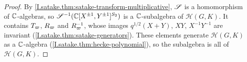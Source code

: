 \begin{theorem}
\end{theorem}
\begin{proof}
By \cref{I.satake.thm:satake-transform-multiplicative}, $\mathscr{S}$ is a homomorphism of $\mathbb{C}$-algebras, so
$\mathscr{S}^{-1}(\mathbb{C}[X^{\pm1},Y^{\pm1}]^{S_2})$ is a $\mathbb{C}$-subalgebra of $\mathcal H(G,K)$. It contains $T_\varpi$, $R_\varpi$
and $R_\varpi^{-1}$, whose images $q^{1/2}(X+Y)$, $XY$, $X^{-1}Y^{-1}$ are invariant
(\cref{I.satake.thm:satake-generators}). These elements generate $\mathcal H(G,K)$ as a $\mathbb{C}$-algebra
(\cref{I.satake.thm:hecke-polynomial}), so the subalgebra is all of $\mathcal H(G,K)$.
\end{proof}

